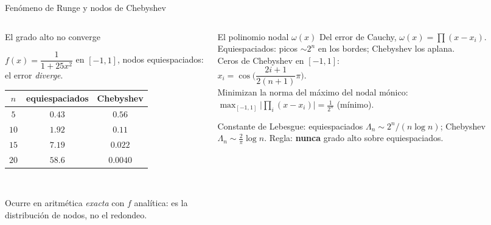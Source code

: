 \documentclass[aspectratio=169,10pt]{beamer}
\begin{document}
\begin{frame}{Fenómeno de Runge y nodos de Chebyshev}
\begin{columns}[T]
\begin{column}{0.50\textwidth}
\begin{cardidea}{El grado alto no converge}{\faChartLine}
{\footnotesize $f(x)=\dfrac{1}{1+25x^2}$ en $[-1,1]$, nodos equiespaciados: el error \emph{diverge}.\\[1.0mm]
\centering
\renewcommand{\arraystretch}{1.16}\setlength{\tabcolsep}{7pt}
\begin{tabular}{c|cc}
$n$ & equiespaciados & Chebyshev\\\hline
$5$ & $0.43$ & $0.56$\\
$10$& $1.92$ & $0.11$\\
$15$& $7.19$ & $0.022$\\
$20$& $58.6$ & $0.0040$\\
\end{tabular}}\\[1.0mm]
{\footnotesize\raggedright Ocurre en aritmética \emph{exacta} con $f$ analítica: es la distribución de nodos, no el redondeo.}
\end{cardidea}
\end{column}
\begin{column}{0.48\textwidth}
\begin{cardgear}{El polinomio nodal $\omega(x)$}{\faSuperscript}
{\footnotesize Del error de Cauchy, $\omega(x)=\prod(x-x_i)$. Equiespaciados: picos $\sim2^n$ en los bordes; Chebyshev los aplana.\\[1.0mm]
Ceros de Chebyshev en $[-1,1]$:\\[0.4mm]
$x_i=\cos\!\Big(\dfrac{2i+1}{2(n+1)}\pi\Big)$.\\[1.0mm]
Minimizan la norma del máximo del nodal mónico:\\[0.4mm]
$\displaystyle\max_{[-1,1]}\Big|\prod_i(x-x_i)\Big|=\frac{1}{2^n}$ (mínimo).}
\end{cardgear}
\vspace{1mm}
\begin{cardnota}[\faInfoCircle]
{\footnotesize Constante de Lebesgue: equiespaciados $\Lambda_n\sim2^n/(n\log n)$; Chebyshev $\Lambda_n\sim\tfrac2\pi\log n$. Regla: \textbf{nunca} grado alto sobre equiespaciados.}
\end{cardnota}
\end{column}
\end{columns}
\end{frame}
\end{document}

